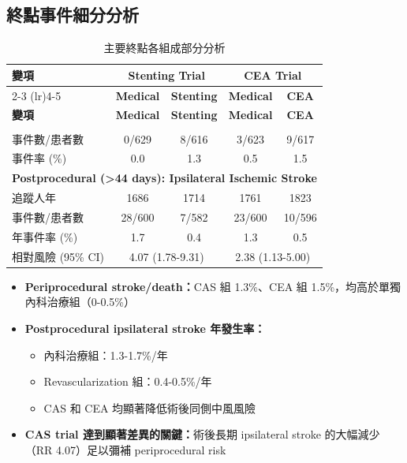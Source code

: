 \documentclass[12pt,a4paper]{article}
\begin{document}
\subsection{終點事件細分分析}

\begin{longtable}{p{5cm}cccc}
\caption{主要終點各組成部分分析} \\
\toprule
\multirow{2}{*}{\textbf{變項}} & \multicolumn{2}{c}{\textbf{Stenting Trial}} & \multicolumn{2}{c}{\textbf{CEA Trial}} \\
\cmidrule(lr){2-3} \cmidrule(lr){4-5}
& \textbf{Medical} & \textbf{Stenting} & \textbf{Medical} & \textbf{CEA} \\
\midrule
\endfirsthead

\toprule
\textbf{變項} & \textbf{Medical} & \textbf{Stenting} & \textbf{Medical} & \textbf{CEA} \\
\midrule
\endhead

\bottomrule
\endfoot

\multicolumn{5}{l}{\textbf{Periprocedural (Day 0-44): Stroke or Death}} \\
事件數/患者數 & 0/629 & 8/616 & 3/623 & 9/617 \\
事件率 (\%) & 0.0 & 1.3 & 0.5 & 1.5 \\
\midrule
\multicolumn{5}{l}{\textbf{Postprocedural (>44 days): Ipsilateral Ischemic Stroke}} \\
追蹤人年 & 1686 & 1714 & 1761 & 1823 \\
事件數/患者數 & 28/600 & 7/582 & 23/600 & 10/596 \\
年事件率 (\%) & 1.7 & 0.4 & 1.3 & 0.5 \\
相對風險 (95\% CI) & \multicolumn{2}{c}{4.07 (1.78-9.31)} & \multicolumn{2}{c}{2.38 (1.13-5.00)} \\
\bottomrule
\end{longtable}

\begin{tcolorbox}[colback=emergency_blue!5!white,colframe=emergency_blue,title=\textbf{重點解讀}]
\begin{itemize}
    \item \textbf{Periprocedural stroke/death：}CAS 組 1.3\%、CEA 組 1.5\%，均高於單獨內科治療組（0-0.5\%）
    \item \textbf{Postprocedural ipsilateral stroke 年發生率：}
    \begin{itemize}
        \item 內科治療組：1.3-1.7\%/年
        \item Revascularization 組：0.4-0.5\%/年
        \item CAS 和 CEA 均顯著降低術後同側中風風險
    \end{itemize}
    \item \textbf{CAS trial 達到顯著差異的關鍵：}術後長期 ipsilateral stroke 的大幅減少（RR 4.07）足以彌補 periprocedural risk
\end{itemize}
\end{tcolorbox}
\end{document}
